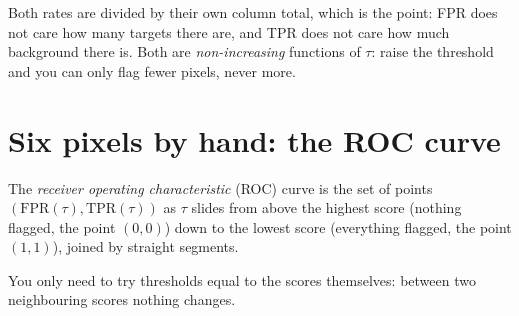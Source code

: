 Both rates are divided by their own column total, which is the point: FPR does not care how many targets there
are, and TPR does not care how much background there is. Both are \emph{non-increasing} functions of $\tau$: raise
the threshold and you can only flag fewer pixels, never more.

\section{Six pixels by hand: the ROC curve}\label{sec:measures:six}

\begin{definition}
The \emph{receiver operating characteristic} (ROC) curve is the set of points
$(\mathrm{FPR}(\tau), \mathrm{TPR}(\tau))$ as $\tau$ slides from above the highest score (nothing flagged, the
point $(0,0)$) down to the lowest score (everything flagged, the point $(1,1)$), joined by straight segments.
\end{definition}

You only need to try thresholds equal to the scores themselves: between two neighbouring scores nothing changes.

